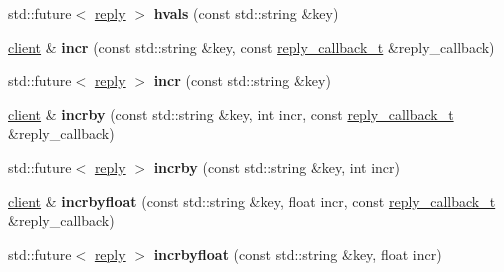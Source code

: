 \begin{DoxyCompactItemize}
std\+::future$<$ \mbox{\hyperlink{classcpp__redis_1_1reply}{reply}} $>$ {\bfseries hvals} (const std\+::string \&key)
\item 
\mbox{\label{classcpp__redis_1_1client_a2f9ba6c7e83451207403096b19da4faa}} 
\mbox{\hyperlink{classcpp__redis_1_1client}{client}} \& {\bfseries incr} (const std\+::string \&key, const \mbox{\hyperlink{classcpp__redis_1_1client_af7a65eb21aa25230bfbb0b0203c4fc04}{reply\+\_\+callback\+\_\+t}} \&reply\+\_\+callback)
\item 
\mbox{\label{classcpp__redis_1_1client_a36ce71119f98cdc29fb29ca33c8b1ff1}} 
std\+::future$<$ \mbox{\hyperlink{classcpp__redis_1_1reply}{reply}} $>$ {\bfseries incr} (const std\+::string \&key)
\item 
\mbox{\label{classcpp__redis_1_1client_a7ee625ebbbfc9fb6f9821b94055e0a5c}} 
\mbox{\hyperlink{classcpp__redis_1_1client}{client}} \& {\bfseries incrby} (const std\+::string \&key, int incr, const \mbox{\hyperlink{classcpp__redis_1_1client_af7a65eb21aa25230bfbb0b0203c4fc04}{reply\+\_\+callback\+\_\+t}} \&reply\+\_\+callback)
\item 
\mbox{\label{classcpp__redis_1_1client_ab7dbabc00708da38938bb461b195f177}} 
std\+::future$<$ \mbox{\hyperlink{classcpp__redis_1_1reply}{reply}} $>$ {\bfseries incrby} (const std\+::string \&key, int incr)
\item 
\mbox{\label{classcpp__redis_1_1client_a3ae6ca0b7896748a8fe5a450550c422e}} 
\mbox{\hyperlink{classcpp__redis_1_1client}{client}} \& {\bfseries incrbyfloat} (const std\+::string \&key, float incr, const \mbox{\hyperlink{classcpp__redis_1_1client_af7a65eb21aa25230bfbb0b0203c4fc04}{reply\+\_\+callback\+\_\+t}} \&reply\+\_\+callback)
\item 
\mbox{\label{classcpp__redis_1_1client_a32c78234437f7f02492e3e01dd44bc43}} 
std\+::future$<$ \mbox{\hyperlink{classcpp__redis_1_1reply}{reply}} $>$ {\bfseries incrbyfloat} (const std\+::string \&key, float incr)
\item 
\mbox{\label{classcpp__redis_1_1client_aaa98ba6f8936eaa013ca0df553199f85}} 

\end{DoxyCompactItemize}
